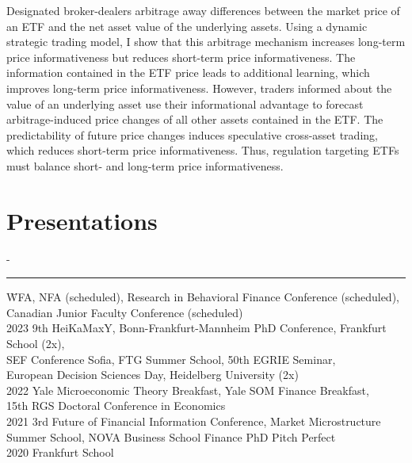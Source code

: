 \documentclass{res}
\newcommand{\sectionline}{	\vspace{-8pt}
	{\parindent-\sectionwidth \rule{\resumewidth}{0.4pt}} }
\newenvironment{nstabbing}
  {\setlength{\topsep}{-\parskip}%
   \setlength{\partopsep}{0pt}%
   \tabbing}
  {\endtabbing}
\begin{document}
\begin{resume}
    Designated broker-dealers arbitrage away differences between the market price of an ETF and the net asset value of the underlying assets. Using a dynamic strategic trading model, I show that this arbitrage mechanism increases long-term price informativeness but reduces short-term price informativeness. The information contained in the ETF price leads to additional learning, which improves long-term price informativeness. However, traders informed about the value of an underlying asset use their informational advantage to forecast arbitrage-induced price changes of all other assets contained in the ETF. The predictability of future price changes induces speculative cross-asset trading, which reduces short-term price informativeness. Thus, regulation targeting ETFs must balance short- and long-term price informativeness.
    
\section{Presentations} 	
	\sectionline
	\vspace{-3ex}
    \begin{nstabbing}
	2024 \qquad \qquad \qquad \= WFA, NFA (scheduled), Research in Behavioral Finance Conference (scheduled), \\
	\> 	Canadian Junior Faculty Conference (scheduled) \\[0.5ex]
	2023 \> 9th HeiKaMaxY, Bonn-Frankfurt-Mannheim PhD Conference, Frankfurt School (2x), \\
	\>  SEF Conference Sofia, FTG Summer School, 50th EGRIE Seminar,\\
	\>  European Decision Sciences Day, Heidelberg University (2x) \\[0.5ex]
    2022 \> Yale Microeconomic Theory Breakfast, Yale SOM Finance Breakfast, \\
    \> 15th RGS Doctoral Conference in Economics \\[0.5ex]
    2021 \> 3rd Future of Financial Information Conference, Market Microstructure \\
    \> Summer School, NOVA Business School Finance PhD Pitch Perfect \\[0.5ex]
    2020 \> Frankfurt School
    \end{nstabbing}
    

\end{resume}
\end{document}

